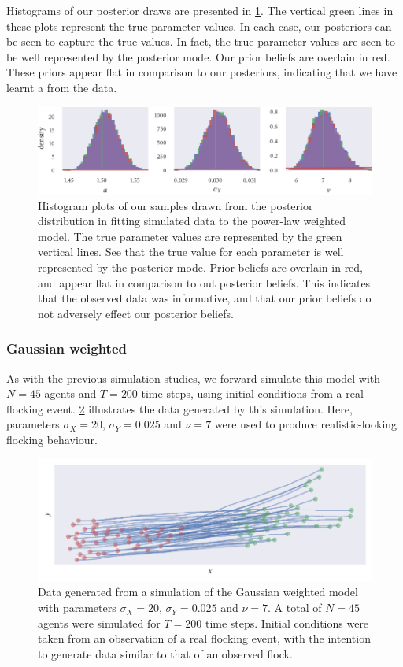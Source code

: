Histograms of our posterior draws are presented in \cref{fig:power_hist}. The
vertical green lines in these plots represent the true parameter values. In
each case, our posteriors can be seen to capture the true values. In fact, the
true parameter values are seen to be well represented by the posterior mode.
Our prior beliefs are overlain in red. These priors appear flat in comparison
to our posteriors, indicating that we have learnt a from the data.

\begin{figure}[tbp]
  \includegraphics{power_hist.pdf}
  \caption{Histogram plots of our samples drawn from the posterior distribution
    in fitting simulated data to the power-law weighted model. The true
    parameter values are represented by the green vertical lines. See that
    the true value for each parameter is well represented by the posterior
    mode. Prior beliefs are overlain in red, and appear flat in comparison to
    out posterior beliefs. This indicates that the observed data was
    informative, and that our prior beliefs do not adversely effect our
    posterior beliefs.}
  \label{fig:power_hist}
\end{figure}

\subsubsection{Gaussian weighted}

As with the previous simulation studies, we forward simulate this model with
$N=45$ agents and $T=200$ time steps, using initial conditions from a real
flocking event. \cref{fig:gauss_sim} illustrates the data generated by this
simulation. Here, parameters $\sigma_X=20$, $\sigma_Y=0.025$ and $\nu=7$ were
used to produce realistic-looking flocking behaviour.

\begin{figure}[tbp]
  \includegraphics{gauss_sim.pdf}
  \caption{Data generated from a simulation of the Gaussian weighted model with
    parameters $\sigma_X=20$, $\sigma_Y=0.025$ and $\nu=7$. A total of $N=45$
    agents were simulated for $T=200$ time steps. Initial conditions
    were taken from an observation of a real flocking event, with the intention
    to generate data similar to that of an observed flock.}
  \label{fig:gauss_sim}
\end{figure}

